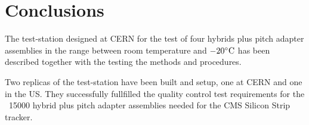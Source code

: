 \section{Conclusions}

The test-station designed at CERN for the test of four hybrids plus
pitch adapter assemblies in the range between room temperature and
$-20^{\circ}{\rm C}$ has been described together with the testing the methods
and procedures.

Two replicas of the test-station have been built and setup, one at
CERN and one in the US. They successfully fullfilled the quality
control test requirements for the ~15000 hybrid plus pitch adapter
assemblies needed for the CMS Silicon Strip tracker.

